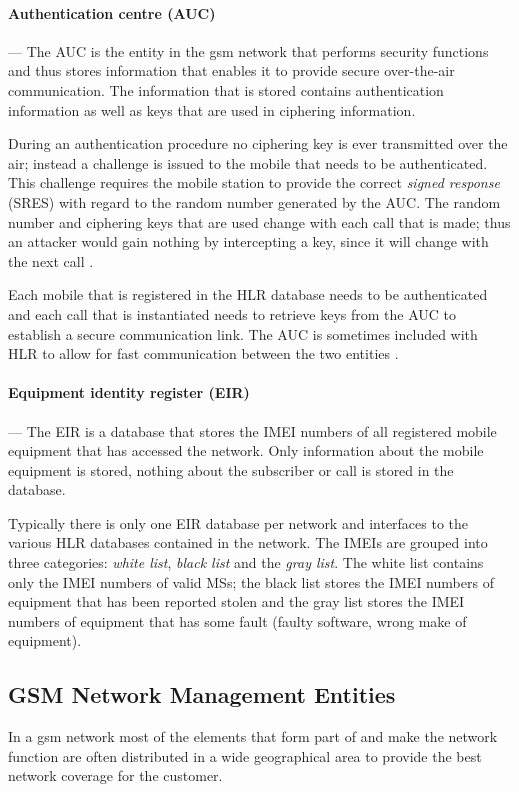 \paragraph{Authentication centre (AUC)}
--- The AUC is the entity in the \gls{gsm} network that performs security functions and thus stores information that enables it to provide secure over-the-air communication\cite{GSM92,GSMSysEngin}. The information that is stored contains authentication information as well as keys that are used in ciphering information\cite{GSM92,GSMSysEngin}.

During an authentication procedure no ciphering key is ever transmitted over the air; instead a challenge is issued to the mobile that needs to be authenticated. This challenge requires the mobile station to provide the correct \emph{signed response} (SRES) with regard to the random number generated by the AUC\cite{GSM92,GSMSysEngin}. The random number and ciphering keys that are used change with each call that is made; thus an attacker would gain nothing by intercepting a key, since it will change with the next call \cite{GSMSysEngin}.

Each mobile that is registered in the HLR database needs to be authenticated and each call that is instantiated needs to retrieve keys from the AUC to establish a secure communication link\cite{GSM92,GSMSysEngin}. The AUC is sometimes included with HLR to allow for fast communication between the two entities \cite{GSMSysEngin}.

\paragraph{Equipment identity register (EIR)}
--- The EIR is a database that stores the IMEI numbers of all registered mobile equipment that has accessed the network. Only information about the mobile equipment is stored, nothing about the subscriber or call is stored in the database.

Typically there is only one EIR database per network and interfaces to the various HLR databases contained in the network. The IMEIs are grouped into three categories: \emph{white list}, \emph{black list} and the \emph{gray list}. The white list contains only the IMEI numbers of valid MSs; the black list stores the IMEI numbers of equipment that has been reported stolen and the gray list stores the IMEI numbers of equipment that has some fault (faulty software, wrong make of equipment).

\subsection{GSM Network Management Entities}
In a \gls{gsm} network most of the elements that form part of and make the network function are often distributed in a wide geographical area to provide the best network coverage for the customer. 

